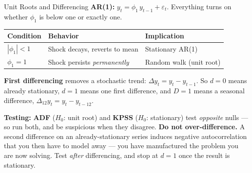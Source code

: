 \documentclass[aspectratio=169, 11pt]{beamer}
\begin{document}
\begin{frame}{Unit Roots and Differencing}
  \textbf{AR(1):} $y_t = \phi_1\,y_{t-1} + \varepsilon_t$. Everything turns on
  whether $\phi_1$ is below one or exactly one.
  \begin{center}
    {\small
    \begin{tabular}{lll}
      \toprule
      \textbf{Condition} & \textbf{Behavior} & \textbf{Implication} \\
      \midrule
      $|\phi_1| < 1$ & Shock decays, reverts to mean & Stationary AR(1) \\
      $\phi_1 = 1$   & Shock persists \emph{permanently} & Random walk (unit root) \\
      \bottomrule
    \end{tabular}
    }
  \end{center}
  \textbf{First differencing} removes a stochastic trend: $\Delta y_t = y_t - y_{t-1}$.
  So $d=0$ means already stationary, $d=1$ means one first difference, and $D=1$ means a
  seasonal difference, $\Delta_{12}y_t = y_t - y_{t-12}$.

  \vspace{0.15cm}
  \textbf{Testing:} \textbf{ADF} ($H_0$: unit root) and \textbf{KPSS} ($H_0$: stationary)
  test \emph{opposite} nulls --- so run both, and be suspicious when they disagree.
  \textbf{Do not over-difference.} A second difference on an already-stationary series
  induces negative autocorrelation that you then have to model away --- you have
  manufactured the problem you are now solving. Test \emph{after} differencing, and stop at
  $d=1$ once the result is stationary.
\end{frame}
\end{document}
